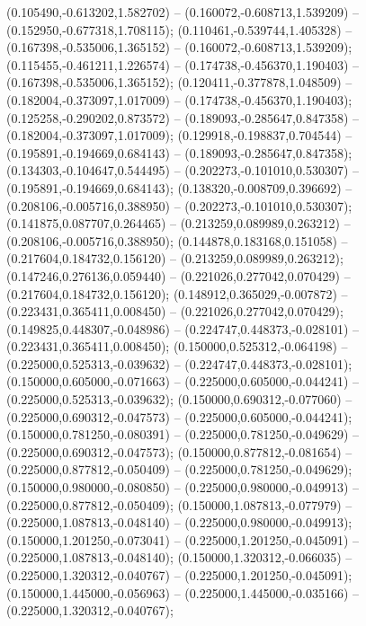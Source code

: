  (0.105490,-0.613202,1.582702) -- (0.160072,-0.608713,1.539209) -- (0.152950,-0.677318,1.708115);
 (0.110461,-0.539744,1.405328) -- (0.167398,-0.535006,1.365152) -- (0.160072,-0.608713,1.539209);
 (0.115455,-0.461211,1.226574) -- (0.174738,-0.456370,1.190403) -- (0.167398,-0.535006,1.365152);
 (0.120411,-0.377878,1.048509) -- (0.182004,-0.373097,1.017009) -- (0.174738,-0.456370,1.190403);
 (0.125258,-0.290202,0.873572) -- (0.189093,-0.285647,0.847358) -- (0.182004,-0.373097,1.017009);
 (0.129918,-0.198837,0.704544) -- (0.195891,-0.194669,0.684143) -- (0.189093,-0.285647,0.847358);
 (0.134303,-0.104647,0.544495) -- (0.202273,-0.101010,0.530307) -- (0.195891,-0.194669,0.684143);
 (0.138320,-0.008709,0.396692) -- (0.208106,-0.005716,0.388950) -- (0.202273,-0.101010,0.530307);
 (0.141875,0.087707,0.264465) -- (0.213259,0.089989,0.263212) -- (0.208106,-0.005716,0.388950);
 (0.144878,0.183168,0.151058) -- (0.217604,0.184732,0.156120) -- (0.213259,0.089989,0.263212);
 (0.147246,0.276136,0.059440) -- (0.221026,0.277042,0.070429) -- (0.217604,0.184732,0.156120);
 (0.148912,0.365029,-0.007872) -- (0.223431,0.365411,0.008450) -- (0.221026,0.277042,0.070429);
 (0.149825,0.448307,-0.048986) -- (0.224747,0.448373,-0.028101) -- (0.223431,0.365411,0.008450);
 (0.150000,0.525312,-0.064198) -- (0.225000,0.525313,-0.039632) -- (0.224747,0.448373,-0.028101);
 (0.150000,0.605000,-0.071663) -- (0.225000,0.605000,-0.044241) -- (0.225000,0.525313,-0.039632);
 (0.150000,0.690312,-0.077060) -- (0.225000,0.690312,-0.047573) -- (0.225000,0.605000,-0.044241);
 (0.150000,0.781250,-0.080391) -- (0.225000,0.781250,-0.049629) -- (0.225000,0.690312,-0.047573);
 (0.150000,0.877812,-0.081654) -- (0.225000,0.877812,-0.050409) -- (0.225000,0.781250,-0.049629);
 (0.150000,0.980000,-0.080850) -- (0.225000,0.980000,-0.049913) -- (0.225000,0.877812,-0.050409);
 (0.150000,1.087813,-0.077979) -- (0.225000,1.087813,-0.048140) -- (0.225000,0.980000,-0.049913);
 (0.150000,1.201250,-0.073041) -- (0.225000,1.201250,-0.045091) -- (0.225000,1.087813,-0.048140);
 (0.150000,1.320312,-0.066035) -- (0.225000,1.320312,-0.040767) -- (0.225000,1.201250,-0.045091);
 (0.150000,1.445000,-0.056963) -- (0.225000,1.445000,-0.035166) -- (0.225000,1.320312,-0.040767);
